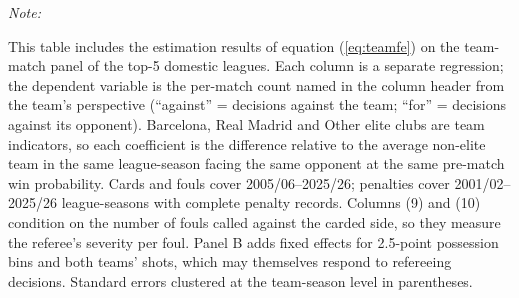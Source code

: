 \begin{table}[!h]
{\begin{threeparttable}
\begin{tabular}[t]{lcccccccccc}
\end{tabular}
\begin{tablenotes}[para]
\item \textit{Note: } 
\item This table includes the estimation results of equation (\ref{eq:teamfe}) on the team-match panel of the top-5 domestic leagues. Each column is a separate regression; the dependent variable is the per-match count named in the column header from the team's perspective (``against'' = decisions against the team; ``for'' = decisions against its opponent). Barcelona, Real Madrid and Other elite clubs are team indicators, so each coefficient is the difference relative to the average non-elite team in the same league-season facing the same opponent at the same pre-match win probability. Cards and fouls cover 2005/06--2025/26; penalties cover 2001/02--2025/26 league-seasons with complete penalty records. Columns (9) and (10) condition on the number of fouls called against the carded side, so they measure the referee's severity per foul. Panel B adds fixed effects for 2.5-point possession bins and both teams' shots, which may themselves respond to refereeing decisions. Standard errors clustered at the team-season level in parentheses.
\end{tablenotes}
\end{threeparttable}}
\end{table}
